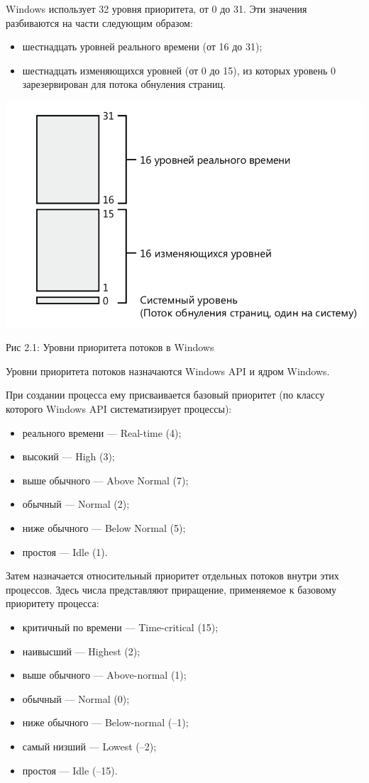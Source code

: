 \documentclass[12pt]{report}
\begin{document}
Windows использует 32 уровня приоритета, от 0 до 31. Эти значения разбиваются на части следующим образом:
\begin{itemize}
\item шестнадцать уровней реального времени (от 16 до 31);
\item шестнадцать изменяющихся уровней (от 0 до 15), из которых уровень 0 зарезервирован для потока обнуления страниц.
\end{itemize}

\begin{center}
		\includegraphics[scale=0.6]{pics/Wind_priority.png}
		
			Рис 2.1: Уровни приоритета потоков в Windows
\end{center}

Уровни приоритета потоков назначаются Windows API и ядром Windows. 

При создании процесса ему присваивается базовый приоритет (по классу которого Windows API систематизирует процессы):
\begin{itemize}
\item реального времени — Real-time (4);
\item высокий — High (3);
\item выше обычного — Above Normal (7);
\item обычный — Normal (2);
\item ниже обычного — Below Normal (5);
\item простоя — Idle (1).
\end{itemize}

Затем назначается относительный приоритет отдельных потоков внутри этих процессов. Здесь числа представляют приращение, применяемое к базовому приоритету процесса:
\begin{itemize}
\item критичный по времени — Time-critical (15);  
\item наивысший — Highest (2);
\item выше обычного — Above-normal (1);
\item обычный — Normal (0);
\item ниже обычного — Below-normal (–1);
\item самый низший — Lowest (–2);
\item простоя — Idle (–15).
\end{itemize}
\end{document}
